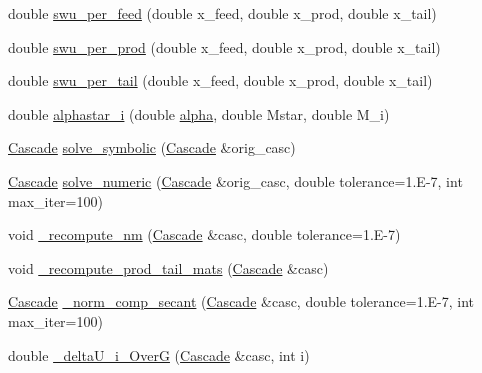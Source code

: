 \begin{DoxyCompactItemize}
double \hyperlink{namespacepyne_1_1enrichment_a7e013d3e5692b8355073d370036350fc}{swu\+\_\+per\+\_\+feed} (double x\+\_\+feed, double x\+\_\+prod, double x\+\_\+tail)
\item 
double \hyperlink{namespacepyne_1_1enrichment_a46dd4b2623e771e39541548cdb67ef69}{swu\+\_\+per\+\_\+prod} (double x\+\_\+feed, double x\+\_\+prod, double x\+\_\+tail)
\item 
double \hyperlink{namespacepyne_1_1enrichment_a4afec2f93f512c5032219bfaf88bf681}{swu\+\_\+per\+\_\+tail} (double x\+\_\+feed, double x\+\_\+prod, double x\+\_\+tail)
\item 
double \hyperlink{namespacepyne_1_1enrichment_acf0727db431f65a3296233ef49456044}{alphastar\+\_\+i} (double \hyperlink{structpyne_1_1alpha}{alpha}, double Mstar, double M\+\_\+i)
\item 
\hyperlink{classpyne_1_1enrichment_1_1_cascade}{Cascade} \hyperlink{namespacepyne_1_1enrichment_aeec6c2b30a2450e191104069d83a24c9}{solve\+\_\+symbolic} (\hyperlink{classpyne_1_1enrichment_1_1_cascade}{Cascade} \&orig\+\_\+casc)
\end{DoxyCompactItemize}
\textbf{ }\par
\begin{DoxyCompactItemize}
\item 
\hyperlink{classpyne_1_1enrichment_1_1_cascade}{Cascade} \hyperlink{namespacepyne_1_1enrichment_a589bcb5f70049e07f791cf0d029bcb4e}{solve\+\_\+numeric} (\hyperlink{classpyne_1_1enrichment_1_1_cascade}{Cascade} \&orig\+\_\+casc, double tolerance=1.\+E-\/7, int max\+\_\+iter=100)
\item 
void \hyperlink{namespacepyne_1_1enrichment_a19f834163164c5b5f4725fae89ac2e22}{\+\_\+recompute\+\_\+nm} (\hyperlink{classpyne_1_1enrichment_1_1_cascade}{Cascade} \&casc, double tolerance=1.\+E-\/7)
\item 
void \hyperlink{namespacepyne_1_1enrichment_ade92dd071c84c71de42599bda809af26}{\+\_\+recompute\+\_\+prod\+\_\+tail\+\_\+mats} (\hyperlink{classpyne_1_1enrichment_1_1_cascade}{Cascade} \&casc)
\item 
\hyperlink{classpyne_1_1enrichment_1_1_cascade}{Cascade} \hyperlink{namespacepyne_1_1enrichment_a27435bc36fca59ca85dcf17b1db17fe4}{\+\_\+norm\+\_\+comp\+\_\+secant} (\hyperlink{classpyne_1_1enrichment_1_1_cascade}{Cascade} \&casc, double tolerance=1.\+E-\/7, int max\+\_\+iter=100)
\item 
double \hyperlink{namespacepyne_1_1enrichment_ab8f3f7b06c2d2d0ec291aaa9c0aef0f6}{\+\_\+delta\+U\+\_\+i\+\_\+\+OverG} (\hyperlink{classpyne_1_1enrichment_1_1_cascade}{Cascade} \&casc, int i)
\end{DoxyCompactItemize}

